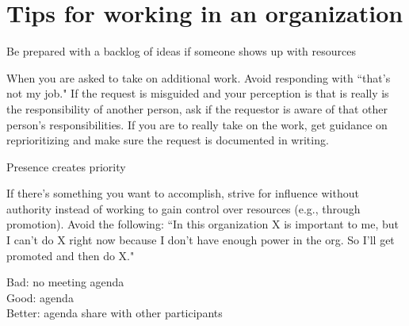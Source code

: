 \section{Tips for working in an organization}

Be prepared with a backlog of ideas if someone shows up with resources

When you are asked to take on additional work. Avoid responding with ``that's not my job." If the request is misguided and your perception is that is really is the responsibility of another person, ask if the requestor is aware of that other person's responsibilities. If you are to really take on the work, get guidance on reprioritizing and make sure the request is documented in writing. 

Presence creates priority

If there's something you want to accomplish, strive for influence without authority instead of working to gain control over resources (e.g., through promotion). Avoid the following: ``In this organization X is important to me, but I can't do X right now because I don't have enough power in the org. So I'll get promoted and then do X."


Bad: no meeting agenda\\
Good: agenda\\
Better: agenda share with other participants

